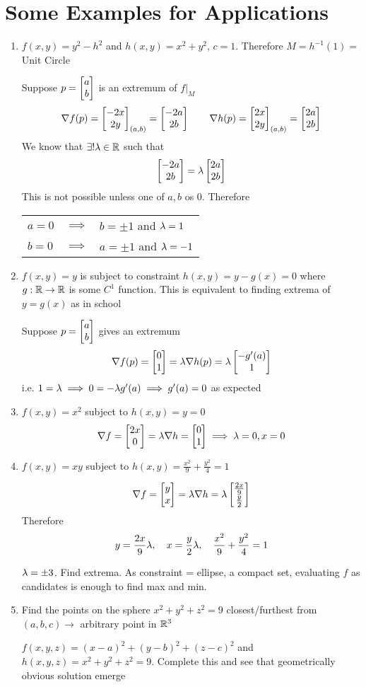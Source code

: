 \section{Some Examples for Applications}
\begin{enumerate}[label=(\roman*)]
	\item $f(x,y)=y^2-h^2$ and $h(x,y)=x^2+y^2$, $c=1$. Therefore $M=h^{-1}(1)=$ Unit Circle
	
	Suppose $p=\left[\begin{matrix}a\\ b\end{matrix}\right]$ is an extremum of $f|_M$ $$\nabla f(p)=\left[\begin{matrix}-2x\\ 2y\end{matrix}\right]_{(a,b)} = \left[\begin{matrix}-2a\\ 2b\end{matrix}\right]\qquad \nabla h(p)=\left[\begin{matrix}2x\\ 2y\end{matrix}\right]_{(a,b)} = \left[\begin{matrix}2a\\ 2b\end{matrix}\right]$$ We know that $\exists ! \lambda \in \mathbb{R}$ such that $$\left[\begin{matrix}-2a\\ 2b\end{matrix}\right]=\lambda \left[\begin{matrix}2a\\ 2b\end{matrix}\right]$$ This is not possible unless one of $a,b$ os 0. Therefore \begin{center}
		\begin{tabular}{lcl}
			$a=0$ & $\implies $ &$b=\pm 1$ and $\lambda=1$\\
			$b=0$ & $\implies$ & $a=\pm 1$ and $\lambda=-1$
		\end{tabular}
	\end{center}
\item $f(x,y)=y$ is subject to constraint $h(x,y)=y-g(x)=0$ where $g:\mathbb{R}\to \mathbb{R}$ is some $C^1$ function. This is equivalent to finding extrema of $y=g(x)$ as in school

Suppose  $p=\left[\begin{matrix}a\\ b\end{matrix}\right]$ gives an extremum $$\nabla f(p)=\left[\begin{matrix}0\\ 1\end{matrix}\right]= \lambda \nabla h(p)=\lambda \left[\begin{matrix}-g'(a)\\ 1\end{matrix}\right]$$i.e. $1=\lambda\implies 0=-\lambda g'(a)\implies g'(a)=0$ as expected
\item $f(x,y)=x^2$ subject to $h(x,y)=y=0$ $$\nabla f=\left[\begin{matrix}2x\\ 0\end{matrix}\right]=\lambda\nabla h=\left[\begin{matrix}0\\ 1\end{matrix}\right]\implies \lambda =0, x=0$$
\item $f(x,y)=xy$ subject to $h(x,y)=\frac{x^2}{9}+\frac{y^2}{4}=1$

$$\nabla f=\left[\begin{matrix}y\\ x\end{matrix}\right] = \lambda \nabla h=\lambda \left[\begin{matrix}\frac{2x}{9}\\ \frac{y}{2}\end{matrix}\right]$$ Therefore $$y=\frac{2x}{9}\lambda, \quad x=\frac{y}{2}\lambda, \quad \frac{x^2}{9}+\frac{y^2}{4}=1$$ 

$\lambda=\pm 3$. Find extrema. As constraint = ellipse, a compact set, evaluating $f$ as candidates is enough to find max and min.
\item Find the points on the sphere $x^2+y^2+z^2=9$ closest/furthest from $(a,b,c)\to$ arbitrary point in $\mathbb{R}^3$

$f(x,y,z)=(x-a)^2+(y-b)^2+(z-c)^2$ and $h(x,y,z)=x^2+y^2+z^2=9$. Complete this and see that geometrically obvious solution emerge 
\end{enumerate}

